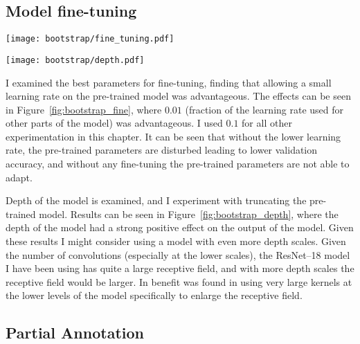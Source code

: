 \subsection{Model fine-tuning}

\begin{figure*}[!ht]
\centering
  \centering
  \texttt{[image: bootstrap/fine\_tuning.pdf]}
  \caption{Influence of learning rate modifier for fine-tuning}  
  \label{fig:bootstrap_fine}
\end{figure*}


\begin{figure*}[!ht]
  \centering
  \texttt{[image: bootstrap/depth.pdf]}
  \caption{Depth of pre-trained model}  
  \label{fig:bootstrap_depth}
\end{figure*}


I examined the best parameters for fine-tuning, finding that allowing a small learning rate on the pre-trained model was advantageous. The effects can be seen in Figure~\ref{fig:bootstrap_fine}, where $0.01$ (fraction of the learning rate used for other parts of the model) was advantageous. I used $ 0.1 $ for all other experimentation in this chapter. It can be seen that without the lower learning rate, the pre-trained parameters are disturbed leading to lower validation accuracy, and without any fine-tuning the pre-trained parameters are not able to adapt.

Depth of the model is examined, and I experiment with truncating the pre-trained model. Results can be seen in Figure~\ref{fig:bootstrap_depth}, where the depth of the model had a strong positive effect on the output of the model. Given these results I might consider using a model with even more depth scales. Given the number of convolutions (especially at the lower scales), the ResNet--18 model I have been using has quite a large receptive field, and with more depth scales the receptive field would be larger. In \cite{Peng2017} benefit was found in using very large kernels at the lower levels of the model specifically to enlarge the receptive field.






\subsection {Partial Annotation}



